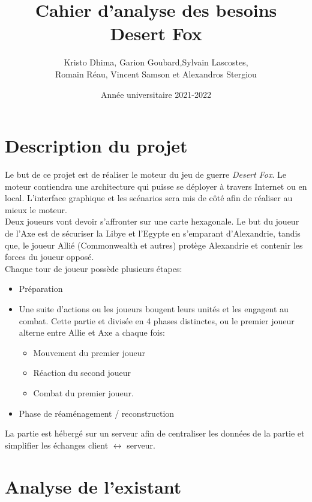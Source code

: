 \documentclass{article}[a4paper, 12pt]
\title{\LARGE \textbf{Cahier d’analyse des besoins } \\ \Large \textbf{Desert Fox}}
\author{Kristo Dhima, Garion Goubard,Sylvain Lascostes, \\Romain Réau, Vincent Samson et Alexandros Stergiou }
\date{Année universitaire 2021-2022}
\begin{document}
\maketitle

\tableofcontents %

\newpage

\section{Description du projet}

Le but de ce projet est de réaliser le moteur du jeu de guerre \emph{Desert Fox}. Le moteur contiendra une architecture qui puisse se déployer à travers Internet ou en local. L'interface graphique et les scénarios sera mis de côté afin de réaliser au mieux le moteur.\\

Deux joueurs vont devoir s'affronter sur une carte hexagonale. Le but du joueur de l'Axe est de sécuriser la Libye et l'Egypte en s'emparant d'Alexandrie, tandis que, le joueur Allié (Commonwealth et autres) protège Alexandrie et contenir les forces du joueur opposé.\\

Chaque tour de joueur possède plusieurs étapes:
\begin{itemize}
    \item Préparation
    \item Une suite d'actions ou les joueurs bougent leurs unités et les engagent au combat. Cette partie et divisée en 4 phases distinctes, ou le premier joueur alterne entre Allie et Axe a chaque fois:
    \begin{itemize}
        \item Mouvement du premier joueur
        \item Réaction du second joueur
        \item Combat du premier joueur.
    \end{itemize}
    \item Phase de réaménagement / reconstruction
\end{itemize}

La partie est hébergé sur un serveur afin de centraliser les données de la partie et simplifier les échanges client $\leftrightarrow$ serveur.

\section{Analyse de l'existant}
\end{document}
